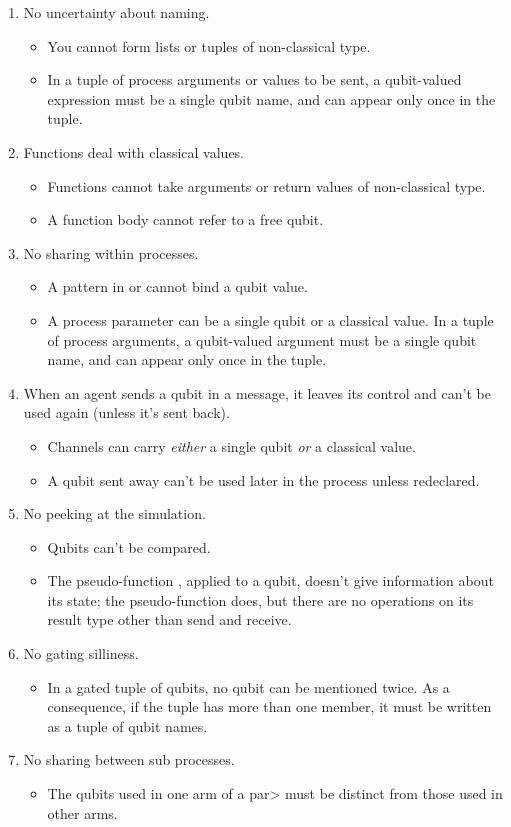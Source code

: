 \begin{enumerate}
\item No uncertainty about naming.
\begin{itemize}
\item You cannot form lists or tuples of non-classical type. 
\item In a tuple of process arguments or values to be sent, a qubit-valued expression must be a single qubit name, and can appear only once in the tuple.
\end{itemize}
\item Functions deal with classical values.
\begin{itemize}
\item Functions cannot take arguments or return values of non-classical type.
\item A function body cannot refer to a free qubit.
\end{itemize}
\item No sharing within processes.
\begin{itemize}
\item A pattern in  or  cannot bind a qubit value.
\item A process parameter can be a single qubit or a classical value. In a tuple of process arguments, a qubit-valued argument must be a single qubit name, and can appear only once in the tuple.
\end{itemize}
\item When an agent sends a qubit in a message, it leaves its control and can't be used again (unless it's sent back). 
\begin{itemize}
\item Channels can carry \emph{either} a single qubit \emph{or} a classical value.
\item A qubit sent away can't be used later in the process unless redeclared.
\end{itemize}
\item No peeking at the simulation.
\begin{itemize}
\item Qubits can't be compared.
\item The pseudo-function , applied to a qubit, doesn't give information about its state; the pseudo-function  does, but there are no operations on its result type  other than send and receive.
\end{itemize}
\item No gating silliness.
\begin{itemize}
\item In a gated tuple of qubits, no qubit can be mentioned twice. As a consequence, if the tuple has more than one member, it must be written as a tuple of qubit names.
\end{itemize}
\item No sharing between sub processes.
\begin{itemize}
\item The qubits used in one arm of a \<par> must be distinct from those used in other arms.
\end{itemize}


\end{enumerate}
